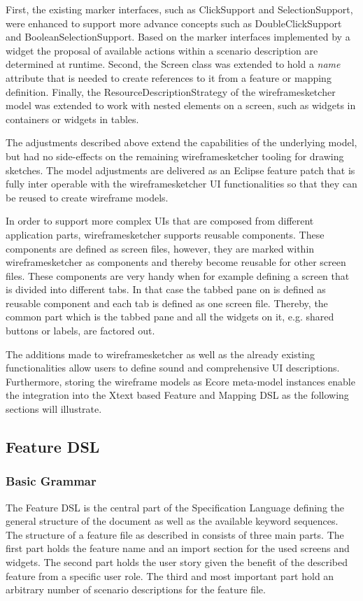 \documentclass{sig-alternate-05-2015}
\begin{document}
{First, the existing marker interfaces, such as ClickSupport and SelectionSupport, were enhanced to support more advance concepts such as DoubleClickSupport and BooleanSelectionSupport.
Based on the marker interfaces implemented by a widget the proposal of available actions within a scenario description are determined at runtime.
Second, the Screen class was extended to hold a \textit{name} attribute that is needed to create references to it from a feature or mapping definition.
Finally, the ResourceDescriptionStrategy of the wireframesketcher model was extended to work with nested elements on a screen, such as widgets in containers or widgets in tables.

The adjustments described above extend the capabilities of the underlying model, but had no side-effects on the remaining wireframesketcher tooling for drawing sketches.
The model adjustments are delivered as an Eclipse feature patch that is fully inter operable with the wireframesketcher UI functionalities so that they can be reused to create wireframe models.

In order to support more complex UIs that are composed from different application parts, wireframesketcher supports reusable components.
These components are defined as screen files, however, they are marked within wireframesketcher as components and thereby become reusable for other screen files.
These components are very handy when for example defining a screen that is divided into different tabs.
In that case the tabbed pane on is defined as reusable component and each tab is defined as one screen file.
Thereby, the common part which is the tabbed pane and all the widgets on it, e.g. shared buttons or labels, are factored out.

The additions made to wireframesketcher as well as the already existing functionalities allow users to define sound and comprehensive UI descriptions. 
Furthermore, storing the wireframe models as Ecore meta-model instances enable the integration into the Xtext based Feature and Mapping DSL as the following sections will illustrate.

\subsection{Feature DSL}
\subsubsection{Basic Grammar}
The Feature DSL is the central part of the Specification Language defining the general structure of the document as well as the available keyword sequences.
The structure of a feature file as described in  consists of three main parts.
The first part holds the feature name and an import section for the used screens and widgets.
The second part holds the user story given the benefit of the described feature from a specific user role.
The third and most important part hold an arbitrary number of scenario descriptions for the feature file.

}
\end{document}
